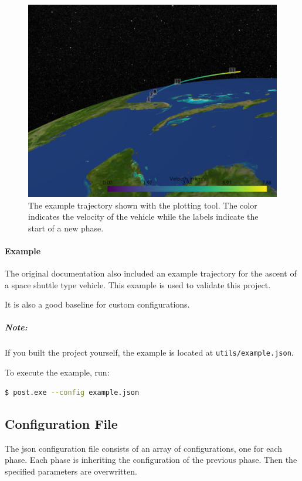 \begin{figure}[!ht]
  \centering
  \includegraphics[width=\textwidth]{images/example-plot.png}
  \caption{The example trajectory shown with the plotting tool. The color
    indicates the velocity of the vehicle while the labels indicate the start of a
    new phase.}
  \label{example-plot}
\end{figure}

\paragraph{Example}

The original documentation also included an example trajectory for the ascent
of a space shuttle type vehicle. This example is used to validate this
project.

It is also a good baseline for custom configurations.

\subparagraph{Note:} If you built the project yourself, the example is located at \lstinline{utils/example.json}.

To execute the example, run:
\begin{lstlisting}[language=sh]
 $ post.exe --config example.json
\end{lstlisting}

\subsection{Configuration File}\label{configuration-file}

The \gls{json} configuration file consists of an array of configurations, one for
each phase. Each phase is inheriting the configuration of the previous phase.
Then the specified parameters are overwritten.

